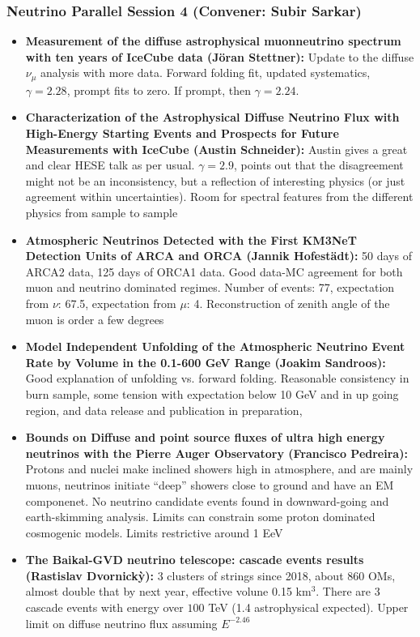 \subsubsection{Neutrino Parallel Session 4 (Convener:  Subir Sarkar)}
\begin{itemize}
    \item \textbf{Measurement of the diffuse astrophysical muonneutrino spectrum with ten years of IceCube data (J\"oran Stettner):} Update to the diffuse $\nu_{\mu}$ analysis with more data. Forward folding fit, updated systematics, $\gamma = 2.28$, prompt fits to zero. If prompt, then $\gamma=2.24$.
    \item \textbf{Characterization of the Astrophysical Diffuse Neutrino Flux with High-Energy Starting Events and Prospects for Future Measurements with IceCube (Austin Schneider):} Austin gives a great and clear HESE talk as per usual. $\gamma = 2.9$, points out that the disagreement might not be an inconsistency, but a reflection of interesting physics (or just agreement within uncertainties). Room for spectral features from the different physics from sample to sample
    \item \textbf{Atmospheric Neutrinos Detected with the First KM3NeT Detection Units of ARCA and ORCA (Jannik Hofest{\"a}dt):} 50 days of ARCA2 data, 125 days of ORCA1 data. Good data-MC agreement for both muon and neutrino dominated regimes. Number of events: 77, expectation from $\nu$: 67.5, expectation from $\mu$: 4. Reconstruction of zenith angle of the muon is order a few degrees
    \item \textbf{Model Independent Unfolding of the Atmospheric Neutrino Event Rate by Volume in the 0.1-600 GeV Range (Joakim Sandroos):} Good explanation of unfolding vs. forward folding. Reasonable consistency in burn sample, some tension with expectation below 10 GeV and in up going region, and data release and publication in preparation, 
    \item  \textbf{Bounds on Diffuse and point source fluxes of ultra high energy neutrinos with the Pierre Auger Observatory (Francisco Pedreira):} Protons and nuclei make inclined showers high in atmosphere, and are mainly muons, neutrinos initiate ``deep'' showers close to ground and have an EM componenet. No neutrino candidate events found in downward-going and earth-skimming analysis. Limits can constrain some proton dominated cosmogenic models. Limits restrictive around 1 EeV
    \item \textbf{ The Baikal-GVD neutrino telescope: cascade events results (Rastislav Dvornick{\`y}):} 3 clusters of strings since 2018, about 860 OMs, almost double that by next year, effective volune 0.15 km$^3$. There are 3 cascade events with energy over $100$ TeV (1.4 astrophysical expected). Upper limit on diffuse neutrino flux assuming $E^{-2.46}$
\end{itemize}

